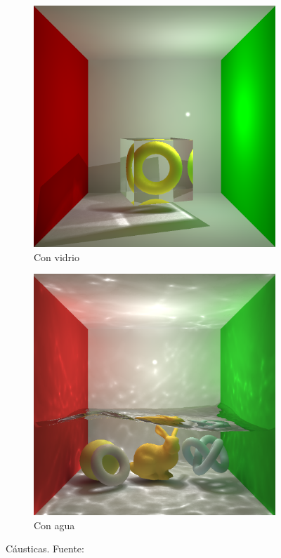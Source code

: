\begin{figure}[h!]
    \begin{subfigure}{.5\textwidth}
        \centering
        \includegraphics[width=\textwidth]{photon-mapping-cornell-box-torus.png}
        \caption{Con vidrio}
    \end{subfigure}
    \begin{subfigure}{.5\textwidth}
        \centering
        \includegraphics[width=\textwidth]{photon-mapping-cornell-box-water.png}
        \caption{Con agua}
    \end{subfigure}
    \caption{Cáusticas. Fuente: \cite{faster-photon-mapping}}
    \label{fig:caustics}
\end{figure}

